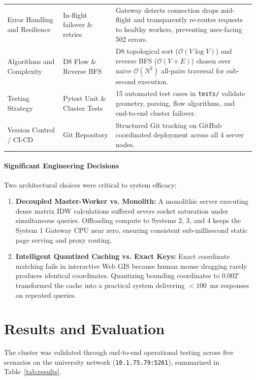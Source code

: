 \documentclass[manuscript,screen,review]{acmart}
\begin{document}
\begin{table}[t]
\begin{tabular}{p{3.2cm}p{4.6cm}p{7.4cm}}
    Error Handling and Resilience & In-flight failover \& retries & Gateway detects connection drops mid-flight and transparently re-routes requests to healthy workers, preventing user-facing 502 errors. \\
    Algorithms and Complexity & D8 Flow \& Reverse BFS & D8 topological sort ($\mathcal{O}(V \log V)$) and reverse BFS ($\mathcal{O}(V + E)$) chosen over naive $\mathcal{O}(N^2)$ all-pairs traversal for sub-second execution. \\
    Testing Strategy & Pytest Unit \& Cluster Tests & 15 automated test cases in \texttt{tests/} validate geometry, parsing, flow algorithms, and end-to-end cluster failover. \\
    Version Control / CI-CD & Git Repository & Structured Git tracking on GitHub coordinated deployment across all 4 server nodes. \\
    \bottomrule
  \end{tabular}
\end{table}

\paragraph{Significant Engineering Decisions}
Two architectural choices were critical to system efficacy:
\begin{enumerate}
    \item \textbf{Decoupled Master-Worker vs. Monolith:} A monolithic server executing dense matrix IDW calculations suffered severe socket saturation under simultaneous queries. Offloading compute to Systems 2, 3, and 4 keeps the System 1 Gateway CPU near zero, ensuring consistent sub-millisecond static page serving and proxy routing.
    \item \textbf{Intelligent Quantized Caching vs. Exact Keys:} Exact coordinate matching fails in interactive Web GIS because human mouse dragging rarely produces identical coordinates. Quantizing bounding coordinates to $0.002^\circ$ transformed the cache into a practical system delivering $<100$~ms responses on repeated queries.
\end{enumerate}

\section{Results and Evaluation}
\label{sec:results}

The cluster was validated through end-to-end operational testing across five scenarios on the university network (\texttt{10.1.75.79:5261}), summarized in Table~\ref{tab:results}.
\end{document}
